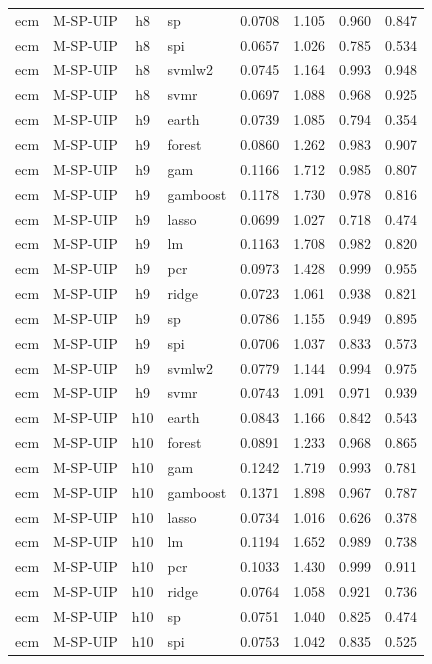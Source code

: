 \begin{ThreePartTable}
\begin{longtable}[t]{llclcccc}
ecm & M-SP-UIP & h8 & sp & 0.0708 & 1.105 & 0.960 & 0.847\\
ecm & M-SP-UIP & h8 & spi & 0.0657 & 1.026 & 0.785 & 0.534\\
ecm & M-SP-UIP & h8 & svmlw2 & 0.0745 & 1.164 & 0.993 & 0.948\\
ecm & M-SP-UIP & h8 & svmr & 0.0697 & 1.088 & 0.968 & 0.925\\
\addlinespace
ecm & M-SP-UIP & h9 & earth & 0.0739 & 1.085 & 0.794 & 0.354\\
ecm & M-SP-UIP & h9 & forest & 0.0860 & 1.262 & 0.983 & 0.907\\
ecm & M-SP-UIP & h9 & gam & 0.1166 & 1.712 & 0.985 & 0.807\\
ecm & M-SP-UIP & h9 & gamboost & 0.1178 & 1.730 & 0.978 & 0.816\\
ecm & M-SP-UIP & h9 & lasso & 0.0699 & 1.027 & 0.718 & 0.474\\
ecm & M-SP-UIP & h9 & lm & 0.1163 & 1.708 & 0.982 & 0.820\\
ecm & M-SP-UIP & h9 & pcr & 0.0973 & 1.428 & 0.999 & 0.955\\
ecm & M-SP-UIP & h9 & ridge & 0.0723 & 1.061 & 0.938 & 0.821\\
ecm & M-SP-UIP & h9 & sp & 0.0786 & 1.155 & 0.949 & 0.895\\
ecm & M-SP-UIP & h9 & spi & 0.0706 & 1.037 & 0.833 & 0.573\\
ecm & M-SP-UIP & h9 & svmlw2 & 0.0779 & 1.144 & 0.994 & 0.975\\
ecm & M-SP-UIP & h9 & svmr & 0.0743 & 1.091 & 0.971 & 0.939\\
\addlinespace
ecm & M-SP-UIP & h10 & earth & 0.0843 & 1.166 & 0.842 & 0.543\\
ecm & M-SP-UIP & h10 & forest & 0.0891 & 1.233 & 0.968 & 0.865\\
ecm & M-SP-UIP & h10 & gam & 0.1242 & 1.719 & 0.993 & 0.781\\
ecm & M-SP-UIP & h10 & gamboost & 0.1371 & 1.898 & 0.967 & 0.787\\
ecm & M-SP-UIP & h10 & lasso & 0.0734 & 1.016 & 0.626 & 0.378\\
ecm & M-SP-UIP & h10 & lm & 0.1194 & 1.652 & 0.989 & 0.738\\
ecm & M-SP-UIP & h10 & pcr & 0.1033 & 1.430 & 0.999 & 0.911\\
ecm & M-SP-UIP & h10 & ridge & 0.0764 & 1.058 & 0.921 & 0.736\\
ecm & M-SP-UIP & h10 & sp & 0.0751 & 1.040 & 0.825 & 0.474\\
ecm & M-SP-UIP & h10 & spi & 0.0753 & 1.042 & 0.835 & 0.525\\

\end{longtable}
\end{ThreePartTable}
